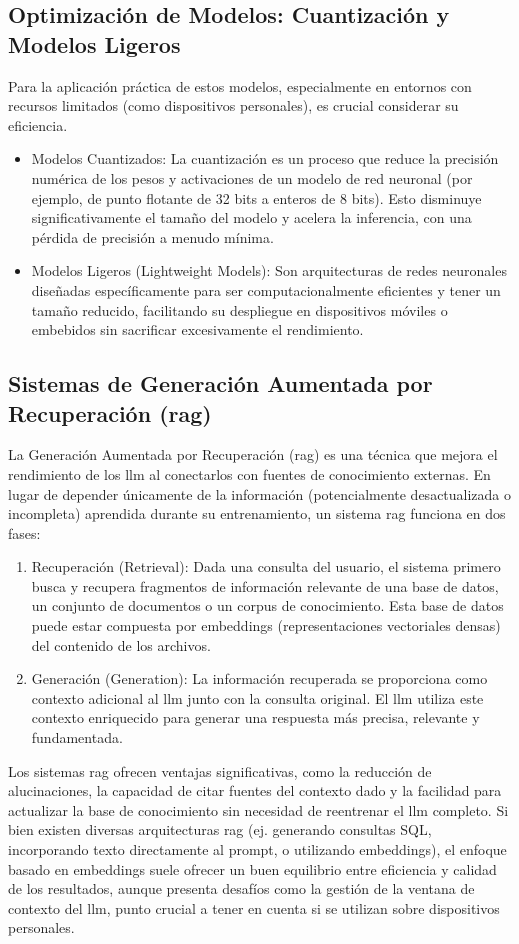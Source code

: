 \subsection{Optimización de Modelos: Cuantización y Modelos Ligeros}
Para la aplicación práctica de estos modelos, especialmente en entornos con recursos limitados (como dispositivos personales), es crucial considerar su eficiencia.
\begin{itemize}
    \item Modelos Cuantizados: La cuantización es un proceso que reduce la precisión numérica de los pesos y activaciones de un modelo de red neuronal (por ejemplo, de punto flotante de 32 bits a enteros de 8 bits). Esto disminuye significativamente el tamaño del modelo y acelera la inferencia, con una pérdida de precisión a menudo mínima.
    \item Modelos Ligeros (Lightweight Models): Son arquitecturas de redes neuronales diseñadas específicamente para ser computacionalmente eficientes y tener un tamaño reducido, facilitando su despliegue en dispositivos móviles o embebidos sin sacrificar excesivamente el rendimiento.
\end{itemize}

\subsection{Sistemas de Generación Aumentada por Recuperación (\gls{rag})}
La Generación Aumentada por Recuperación (\gls{rag}) es una técnica que mejora el rendimiento de los \gls{llm} al conectarlos con fuentes de conocimiento externas. En lugar de depender únicamente de la información (potencialmente desactualizada o incompleta) aprendida durante su entrenamiento, un sistema \gls{rag} funciona en dos fases:
\begin{enumerate}
    \item Recuperación (Retrieval): Dada una consulta del usuario, el sistema primero busca y recupera fragmentos de información relevante de una base de datos, un conjunto de documentos o un corpus de conocimiento. Esta base de datos puede estar compuesta por embeddings (representaciones vectoriales densas) del contenido de los archivos.
    \item Generación (Generation): La información recuperada se proporciona como contexto adicional al \gls{llm} junto con la consulta original. El \gls{llm} utiliza este contexto enriquecido para generar una respuesta más precisa, relevante y fundamentada.
\end{enumerate}
Los sistemas \gls{rag} ofrecen ventajas significativas, como la reducción de alucinaciones, la capacidad de citar fuentes del contexto dado y la facilidad para actualizar la base de conocimiento sin necesidad de reentrenar el \gls{llm} completo. Si bien existen diversas arquitecturas \gls{rag} (ej. generando consultas SQL, incorporando texto directamente al prompt, o utilizando embeddings), el enfoque basado en embeddings suele ofrecer un buen equilibrio entre eficiencia y calidad de los resultados, aunque presenta desafíos como la gestión de la ventana de contexto del \gls{llm}, punto crucial a tener en cuenta si se utilizan sobre dispositivos personales.

